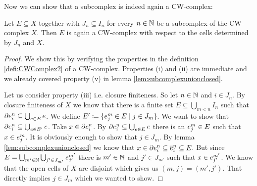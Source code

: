 Now we can show that a subcomplex is indeed again a CW-complex: 

\begin{lem}
    Let $E \subseteq X$ together with $J_n \subseteq I_n$ for every $n \in \bN$ be a subcomplex of the CW-complex $X$. 
    Then $E$ is again a CW-complex with respect to the cells determined by $J_n$ and $X$.
\end{lem}
\begin{proof}
    We show this by verifying the properties in the definition \ref{defi:CWComplex2} of a CW-complex. 
    Properties (i) and (ii) are immediate and we already covered property (v) in lemma \ref{lem:subcomplexunionclosed}.

    Let us consider property (iii) i.e. closure finiteness. 
    So let $n \in \bN$ and $i \in J_n$. 
    By closure finiteness of $X$ we know that there is a finite set $E \subseteq \bigcup_{m < n} I_n$ such that $\cellFrontier{n}{i} \subseteq \bigcup_{e \in E}e$. 
    We define $E' \coloneq \{\openCell{m}{j} \in E \mid j \in J_m\}$. 
    We want to show that $\cellFrontier{n}{i} \subseteq \bigcup_{e \in E'}e$. 
    Take $x \in \cellFrontier{n}{i}$. 
    By $\cellFrontier{n}{i} \subseteq \bigcup_{e \in E}e$ there is an $\openCell{m}{j} \in E$ such that $x \in \openCell{m}{j}$. 
    It is obviously enough to show that $j \in J_m$. 
    By lemma \ref{lem:subcomplexunionclosed} we know that $x \in \cellFrontier{n}{i} \subseteq \closedCell{n}{i} \subseteq E$.
    But since $E = \bigcup_{m' \in \bN} \bigcup_{j' \in J_{m'}} \openCell{m'}{j'}$ there is $m' \in \bN$ and $j' \in J_{m'}$ such that $x \in \openCell{m'}{j'}$. 
    We know that the open cells of $X$ are disjoint which gives us $(m, j) = (m', j')$. 
    That directly implies $j \in J_m$ which we wanted to show. 


\end{proof}
